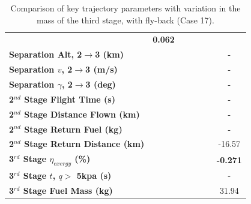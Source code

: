 \begin{table}[ht]
\begin{tabular}{l c c c c c c}
		& \textbf{0.062}
		\\
		\textbf{Separation Alt, 2$\rightarrow$3 (km)}
		& \secondthirdSeparationAltmThreeNinety
		& \secondthirdSeparationAltmThreeNinetyFive
		& \secondthirdSeparationAltmThreeStandard
		& \secondthirdSeparationAltmThreeOneHundredFive
		& \secondthirdSeparationAltmThreeOneHundredTen
		& -
		\\
		\textbf{Separation $v$, 2$\rightarrow$3 (m/s)}
		& \secondthirdSeparationvmThreeNinety
		& \secondthirdSeparationvmThreeNinetyFive
		& \secondthirdSeparationvmThreeStandard
		& \secondthirdSeparationvmThreeOneHundredFive
		& \secondthirdSeparationvmThreeOneHundredTen
		& -
		\\
		\textbf{Separation $\gamma$, 2$\rightarrow$3 (deg)}
		& \secondthirdSeparationgammamThreeNinety
		& \secondthirdSeparationgammamThreeNinetyFive
		& \secondthirdSeparationgammamThreeStandard
		& \secondthirdSeparationgammamThreeOneHundredFive
		& \secondthirdSeparationgammamThreeOneHundredTen
		& -
		\\
		\textbf{2$^{nd}$ Stage Flight Time (s)}
		& \secondFlightTimemThreeNinety
		& \secondFlightTimemThreeNinetyFive
		& \secondFlightTimemThreeStandard
		& \secondFlightTimemThreeOneHundredFive
		& \secondFlightTimemThreeOneHundredTen
		& -
		\\
		\textbf{2$^{nd}$ Stage Distance Flown (km)}
		& \SecondDistmThreeNinety
		& \SecondDistmThreeNinetyFive
		& \SecondDistmThreeStandard
		& \SecondDistmThreeOneHundredFive
		& \SecondDistmThreeOneHundredTen
		& -
		\\
		\textbf{2$^{nd}$ Stage Return Fuel (kg)}
		& \returnFuelmThreeNinety
		& \returnFuelmThreeNinetyFive
		& \returnFuelmThreeStandard
		& \returnFuelmThreeOneHundredFive
		& \returnFuelmThreeOneHundredTen
		& -
		\\
		\textbf{2$^{nd}$ Stage Return Distance (km)}
		& \returnDistmThreeNinety
		& \returnDistmThreeNinetyFive
		& \returnDistmThreeStandard
		& \returnDistmThreeOneHundredFive
		& \returnDistmThreeOneHundredTen
		&-16.57
		\\
		\hline 
		\textbf{3$^{rd}$ Stage $\eta_{exergy}$ (\%)}
		& \textbf{\thirddExergyEffmThreeNinety}
		& \textbf{\thirddExergyEffmThreeNinetyFive}
		& \textbf{\thirddExergyEffmThreeStandard}
		& \textbf{\thirddExergyEffmThreeOneHundredFive}
		& \textbf{\thirddExergyEffmThreeOneHundredTen}
		& \textbf{-0.271}
		\\
		\textbf{3$^{rd}$ Stage $t$, $q >$ 5kpa (s)}
		& \thirdqOverFivemThreeNinety
		& \thirdqOverFivemThreeNinetyFive
		& \thirdqOverFivemThreeStandard
		& \thirdqOverFivemThreeOneHundredFive
		& \thirdqOverFivemThreeOneHundredTen
		& -
		\\
		\textbf{3$^{rd}$ Stage Fuel Mass (kg)}
		& \thirdmFuelmThreeNinety
		& \thirdmFuelmThreeNinetyFive
		& \thirdmFuelmThreeStandard
		& \thirdmFuelmThreeOneHundredFive
		& \thirdmFuelmThreeOneHundredTen
		&31.94
		\\
		\hline 
	\end{tabular} 
	\caption{Comparison of key trajectory parameters with variation in the mass of the third stage, with fly-back (Case 17).}
	\label{tab:comparison81}
\end{table}
